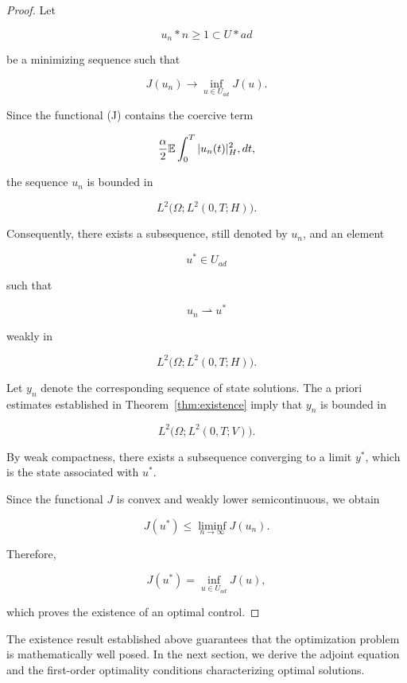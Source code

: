 \begin{proof}

Let

\[
{u_n}*{n\ge1}
\subset U*{ad}
\]

be a minimizing sequence such that

\[
J(u_n)
\longrightarrow
\inf_{u\in U_{ad}} J(u).
\]

Since the functional (J) contains the coercive term

\[
\frac{\alpha}{2}
\mathbb{E}
\int_0^T
|u_n(t)|_H^2,dt,
\]

the sequence \({u_n}\) is bounded in

\[
L^2
\bigl(
\Omega;
L^2(0,T;H)
\bigr).
\]

Consequently, there exists a subsequence, still denoted by \({u_n}\), and an element

\[
u^\ast
\in
U_{ad}
\]

such that

\[
u_n
\rightharpoonup
u^\ast
\]

weakly in

\[
L^2
\bigl(
\Omega;
L^2(0,T;H)
\bigr).
\]

Let \(y_n\) denote the corresponding sequence of state solutions. The a priori estimates 
established in Theorem~\ref{thm:existence} imply that \({y_n}\) is bounded in

\[
L^2
\bigl(
\Omega;
L^2(0,T;V)
\bigr).
\]

By weak compactness, there exists a subsequence converging to a limit \(y^\ast\), which 
is the state associated with \(u^\ast\).

Since the functional \(J\) is convex and weakly lower semicontinuous, we obtain

\[
J(u^\ast)
\le
\liminf_{n\to\infty}
J(u_n).
\]

Therefore,

\[
J(u^\ast)
=
\inf_{u\in U_{ad}}
J(u),
\]

which proves the existence of an optimal control.
\end{proof}

The existence result established above guarantees that the optimization problem is 
mathematically well posed. In the next section, we derive the adjoint equation and 
the first-order optimality conditions characterizing optimal solutions.
